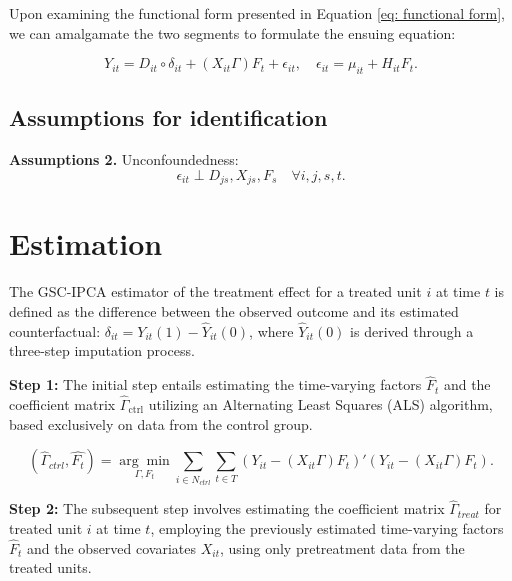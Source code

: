\documentclass[12pt]{article}
\begin{document}
Upon examining the functional form presented in Equation \ref{eq: functional form}, we can amalgamate the two segments to formulate the ensuing equation:


\begin{equation}
Y_{it} = D_{it} \circ \delta_{it} + (X_{it}\Gamma) F_{t} + \epsilon_{it}, \quad \epsilon_{it} = \mu_{it} + H_{it}F_t.
\tag{2}
\label{eq: combined}
\end{equation}
\subsection{Assumptions for identification}
\textbf{Assumptions 2.} Unconfoundedness:
\begin{equation*}
\epsilon_{it} \perp D_{js}, X_{js}, F_s \quad \forall i, j, s, t.
\end{equation*}


\section{Estimation}
\label{sec: estimation}
The GSC-IPCA estimator of the treatment effect for a treated unit $i$ at time $t$ is defined as the difference between the observed outcome and its estimated counterfactual: $\delta_{it} = Y_{it}(1) - \hat{Y}_{it}(0)$, where $\hat{Y}_{it}(0)$ is derived through a three-step imputation process.

\textbf{Step 1:} The initial step entails estimating the time-varying factors $\hat{F}_t$ and the coefficient matrix $\hat{\Gamma}_{\text{ctrl}}$ utilizing an Alternating Least Squares (ALS) algorithm, based exclusively on data from the control group.

\begin{equation}
(\hat{\Gamma}_{ctrl}, \hat{F_t}) = \underset{\Gamma, F_t}{\arg\min} \sum_{i \in N_{ctrl}} \sum_{t \in T}\left( Y_{it} - (X_{it}\Gamma) F_{t} \right)'\left( Y_{it} - (X_{it}\Gamma) F_{t} \right).
\tag{3}
\label{eq: optimization}
\end{equation}

\textbf{Step 2:} The subsequent step involves estimating the coefficient matrix $\hat{\Gamma}_{treat}$ for treated unit $i$ at time $t$, employing the previously estimated time-varying factors $\hat{F}_t$ and the observed covariates $X_{it}$, using only pretreatment data from the treated units.
\end{document}
